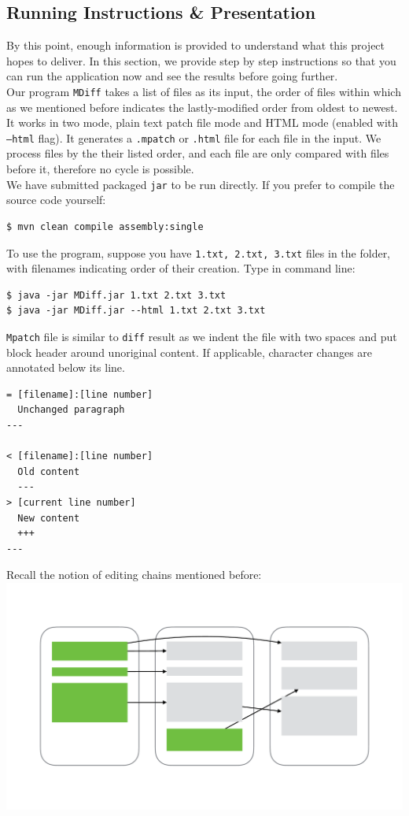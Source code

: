 \documentclass{article}
\begin{document}
\subsection{Running Instructions \& Presentation}
By this point, enough information is provided to understand what this project hopes to deliver. In this section, we provide step by step instructions so that you can run the application now and see the results before going further.\\

Our program \texttt{MDiff} takes a list of files as its input, the order of files within which as we mentioned before indicates the lastly-modified order from oldest to newest. It works in two mode, plain text patch file mode and HTML mode (enabled with \texttt{--html} flag). It generates a \texttt{.mpatch} or \texttt{.html} file for each file in the input. We process files by the their listed order, and each file are only compared with files before it, therefore no cycle is possible.\\

We have submitted packaged \texttt{jar} to be run directly. If you prefer to compile the source code yourself:
\begin{lstlisting}
$ mvn clean compile assembly:single
\end{lstlisting}

To use the program, suppose you have \texttt{1.txt, 2.txt, 3.txt} files in the folder, with filenames indicating order of their creation. Type in command line:
\begin{lstlisting}
$ java -jar MDiff.jar 1.txt 2.txt 3.txt
$ java -jar MDiff.jar --html 1.txt 2.txt 3.txt
\end{lstlisting}

\texttt{Mpatch} file is similar to \texttt{diff} result as we indent the file with two spaces and put block header around unoriginal content. If applicable, character changes are annotated below its line.
\begin{lstlisting}
= [filename]:[line number]
  Unchanged paragraph
---

< [filename]:[line number]
  Old content
  ---
> [current line number]
  New content
  +++
---
\end{lstlisting}
Recall the notion of editing chains mentioned before:\\
\includegraphics[scale=0.4,center]{1.pdf}\\
\end{document}

